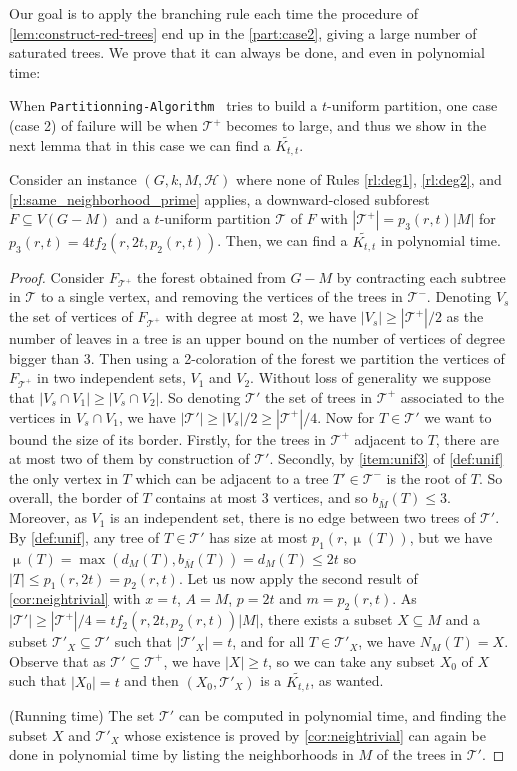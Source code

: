 \documentclass{amsart}
\newcommand{\algopart }{\texttt{Partitionning-Algorithm}~ }
\newcommand{\bom}{b_{\overline{M}}}
\newcommand{\mT}{\mathcal{T}}
\newcommand{\mH}{\mathcal{H}}
\newcommand{\KttTilde}{\widetilde{K_{t,t}}}
\DeclareMathOperator\db{\mu}
\newcommand{\ruleref}[1]{\hyperref[#1]{\ref*{#1}}}
\begin{document}
Our goal is to apply the branching rule each time the procedure of \autoref{lem:construct-red-trees} end up in the \autoref{part:case2}, giving a large number of saturated trees. We prove that it can always be done, and even in polynomial time:


When \algopart tries to build a $t$-uniform partition, one case (case 2) of failure will be when $\mT^+$ becomes to large, 
and thus we show in the next lemma that in this case we can find a $\KttTilde$.
\begin{lemma}\label{lm:bigreduce}
   Consider an instance $(G, k, M, \mH)$ where none of Rules \ruleref{rl:deg1}, \ruleref{rl:deg2}, and \ruleref{rl:same_neighborhood_prime} applies,
 a downward-closed subforest $F \subseteq V(G-M)$ and a $t$-uniform partition $\mT$ of $F$ with $|\mT^+|=p_3(r,t)|M|$ for $p_3(r,t)=4tf_2(r,2t,p_2(r,t))$. 
 Then, we can find a $\KttTilde$ in polynomial time.
\end{lemma}
\begin{proof}
    Consider $F_{\mT^+}$ the forest obtained from $G-M$ by contracting each subtree in $\mT$ to a single vertex, and removing the vertices of the trees in $\mT^-$. Denoting $V_s$ the set of vertices of $F_{\mT^+}$ with degree at most $2$, we have $|V_s|\geq |\mT^+|/2$ as the number of leaves in a tree is an upper bound on the number of vertices of degree bigger than $3$.
    Then using a 2-coloration of the forest we partition the vertices of $F_{\mT^+}$ in two independent sets, $V_1$ and $V_2$. 
    Without loss of generality we suppose that $|V_s\cap V_1|\geq |V_s\cap V_2|$. So denoting $\mT'$ the set of trees in $\mT^+$ associated to the vertices in $V_s\cap V_1$, we have $|\mT'|\geq |V_s|/2\geq |\mT^+|/4$. Now for $T\in \mT'$ we want to bound the size of its border. 
    Firstly,  for the trees in $\mT^+$ adjacent to $T$, there are at most two of them by construction of $\mT'$.
    Secondly,  by \autoref{item:unif3}  of \autoref{def:unif} the only vertex in $T$ which can be adjacent to a tree $T'\in \mT^-$ is the root of $T$. 
    So overall, the border of $T$ contains at most $3$ vertices, and so $\bom(T)\leq 3$. Moreover, as $V_1$ is an independent set, there is no edge between two trees of $\mT'$. By \autoref{def:unif}, any tree of $T\in \mT'$ has size at most $p_1(r,\db(T))$, but we have $\db(T)=\max(d_M(T), \bom(T))=d_M(T)\leq 2t$ so $|T|\leq p_1(r,2t)=p_2(r,t)$. Let us now apply the second result of \autoref{cor:neightrivial} with $x=t$, $A=M$, $p=2t$ and $m=p_2(r,t)$.
    As $|\mT'|\geq |\mT^+|/4 = tf_2(r,2t,p_2(r,t))|M|$, there exists a subset $X\subseteq M$ and a subset $\mT'_X\subseteq\mT'$ such that $|\mT'_X|=t$, and for all $T\in \mT'_X$, we have $N_M(T)=X$. Observe that as $\mT'\subseteq \mT^+$, we have $|X|\geq t$, so we can take  any subset $X_0$ of $X$ such that $|X_0|=t$ and then $(X_0, \mT'_X)$ is a $\KttTilde$, as wanted.
    
    (Running time) The set $\mT'$ can be computed in polynomial time, and finding the subset $X$ and $\mT'_X$ whose existence is proved by \autoref{cor:neightrivial} can again be done in polynomial time by listing the neighborhoods in $M$ of the trees in $\mT'$. 
\end{proof}
\end{document}
